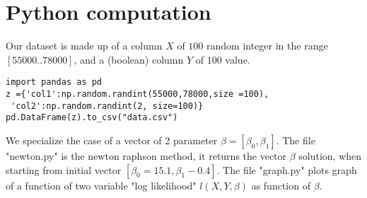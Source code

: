 \documentclass[12pt]{article}
\begin{document}
\section{Python computation}
Our dataset is made up of a column $X$ of $100$ random integer in the range $[55000..78000]$, and a (boolean) column $Y$ of $100$ value.\\
\begin{verbatim}
import pandas as pd
z ={'col1':np.random.randint(55000,78000,size =100),
 'col2':np.random.randint(2, size=100)} 
pd.DataFrame(z).to_csv("data.csv") 
\end{verbatim}
We specialize the case of a vector of 2 parameter $\beta = \left[ \beta_{0},\beta_{1} \right]$.
The file "newton.py" is the newton raphson method, it returns the vector $\beta$ solution, when starting from initial vector $[\beta_{0} = 15.1,\beta_{1}-0.4]$.
The file "graph.py" plots graph of a function of two variable  "log likelihood" $l(X,Y,\beta)$ as function of $\beta$.
\end{document}
